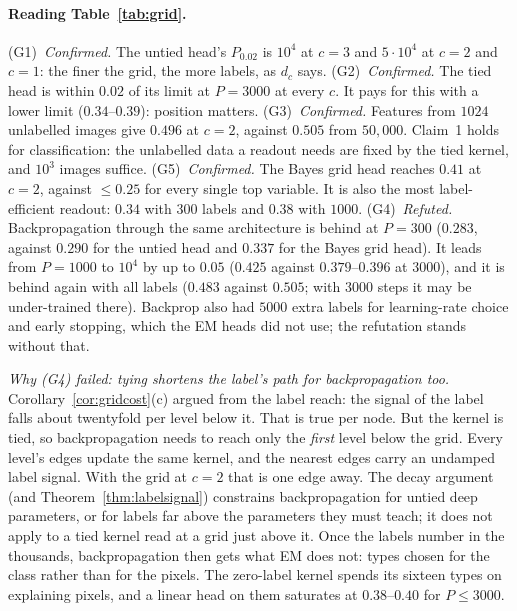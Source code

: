 \documentclass[11pt]{article}
\theoremstyle{definition}
\begin{document}
\paragraph{Reading Table~\ref{tab:grid}.}
(G1)~\emph{Confirmed.} The untied head's $P_{0.02}$ is $10^4$ at $c=3$ and $5\cdot10^4$ at $c=2$ and $c=1$: the finer the grid,
the more labels, as $d_c$ says.
(G2)~\emph{Confirmed.} The tied head is within $0.02$ of its limit at $P=3000$ at every $c$. It pays for this with a lower
limit ($0.34$--$0.39$): position matters.
(G3)~\emph{Confirmed.} Features from $1024$ unlabelled images give $0.496$ at $c=2$, against $0.505$ from $50{,}000$. Claim~1
holds for classification: the unlabelled data a readout needs are fixed by the tied kernel, and $10^3$ images suffice.
(G5)~\emph{Confirmed.} The Bayes grid head reaches $0.41$ at $c=2$, against $\le0.25$ for every single top variable. It is
also the most label-efficient readout: $0.34$ with $300$ labels and $0.38$ with $1000$.
(G4)~\emph{Refuted.} Backpropagation through the same architecture is behind at $P=300$ ($0.283$, against $0.290$ for the
untied head and $0.337$ for the Bayes grid head). It leads from $P=1000$ to $10^4$ by up to $0.05$ ($0.425$ against
$0.379$--$0.396$ at $3000$), and it is behind again with all labels ($0.483$ against $0.505$; with $3000$ steps it may be
under-trained there). Backprop also had $5000$ extra labels for learning-rate choice and early stopping, which the EM heads did
not use; the refutation stands without that.

\emph{Why (G4) failed: tying shortens the label's path for backpropagation too.} Corollary~\ref{cor:gridcost}(c) argued
from the label reach: the signal of the label falls about twentyfold per level below it. That is true per node. But the
kernel is tied, so backpropagation needs to reach only the \emph{first} level below the grid. Every level's edges update the
same kernel, and the nearest edges carry an undamped label signal. With the grid at $c=2$ that is one edge away. The decay
argument (and Theorem~\ref{thm:labelsignal}) constrains backpropagation for untied deep parameters, or for labels far
above the parameters they must teach; it does not apply to a tied kernel read at a grid just above it. Once the labels
number in the thousands, backpropagation then gets what EM does not: types chosen for the class rather than for the pixels.
The zero-label kernel spends its sixteen types on explaining pixels, and a linear head on them saturates at $0.38$--$0.40$
for $P\le3000$.
\end{document}
